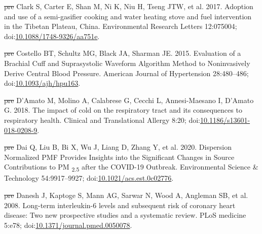 \documentclass[
  letterpaper,
  DIV=11,
  numbers=noendperiod]{scrartcl}
\newlength{\cslhangindent}
\newenvironment{CSLReferences}[2] %
 {\begin{list}{}{%
  \setlength{\itemindent}{0pt} %
  \setlength{\leftmargin}{0pt} %
  \setlength{\parsep}{0pt} %
  \ifodd #1
   \setlength{\leftmargin}{\cslhangindent} %
   \setlength{\itemindent}{-1\cslhangindent} %
  \fi
  \setlength{\itemsep}{#2\baselineskip}}} %
 {\end{list}} %
\providecommand{\DIFdel}[1]{{\protect\color{red}\sout{#1}}}                      %
\providecommand{\DIFaddbegin}{} %
\providecommand{\DIFaddend}{} %
\providecommand{\DIFdelbegin}{} %
\providecommand{\DIFdelend}{} %
\newcommand{\DIFscaledelfig}{0.5}
\newlength{\DIFdelgraphicswidth} %
\newlength{\DIFdelgraphicsheight} %
\newcommand{\DIFaddincludegraphics}[2][]{{\color{blue}\fbox{\DIFOincludegraphics[#1]{#2}}}} %
\newcommand{\DIFdelincludegraphics}[2][]{%
\sbox{\DIFdelgraphicsbox}{\DIFOincludegraphics[#1]{#2}}%
\settoboxwidth{\DIFdelgraphicswidth}{\DIFdelgraphicsbox} %
\settoboxtotalheight{\DIFdelgraphicsheight}{\DIFdelgraphicsbox} %
\scalebox{\DIFscaledelfig}{%
\parbox[b]{\DIFdelgraphicswidth}{\usebox{\DIFdelgraphicsbox}\\[-\baselineskip] \rule{\DIFdelgraphicswidth}{0em}}\llap{\resizebox{\DIFdelgraphicswidth}{\DIFdelgraphicsheight}{%
\setlength{\unitlength}{\DIFdelgraphicswidth}%
\begin{picture}(1,1)%
\thicklines\linethickness{2pt} %
{\color[rgb]{1,0,0}\put(0,0){\framebox(1,1){}}}%
{\color[rgb]{1,0,0}\put(0,0){\line( 1,1){1}}}%
{\color[rgb]{1,0,0}\put(0,1){\line(1,-1){1}}}%
\end{picture}%
}\hspace*{3pt}}} %
} %
\DeclareRobustCommand{\DIFaddbegin}{\DIFOaddbegin \let\includegraphics\DIFaddincludegraphics} %
\DeclareRobustCommand{\DIFaddend}{\DIFOaddend \let\includegraphics\DIFOincludegraphics} %
\DeclareRobustCommand{\DIFdelbegin}{\DIFOdelbegin \let\includegraphics\DIFdelincludegraphics} %
\DeclareRobustCommand{\DIFdelend}{\DIFOaddend \let\includegraphics\DIFOincludegraphics} %
\begin{document}
\begin{CSLReferences}{1}{1}
\DIFdelbegin %
\DIFdel{pre}%
\DIFdelend \DIFaddbegin {}
\DIFaddend Clark S, Carter E, Shan M, Ni K, Niu H, Tseng JTW, et al. 2017. Adoption
and use of a semi-gasifier cooking and water heating stove and fuel
intervention in the {Tibetan Plateau}, {China}. Environmental Research
Letters 12:075004;
doi:\href{https://doi.org/10.1088/1748-9326/aa751e}{10.1088/1748-9326/aa751e}.

\DIFdelbegin %
\DIFdel{pre}%
\DIFdelend \DIFaddbegin {}
\DIFaddend Costello BT, Schultz MG, Black JA, Sharman JE. 2015. Evaluation of a
{Brachial Cuff} and {Suprasystolic Waveform Algorithm Method} to
{Noninvasively Derive Central Blood Pressure}. American Journal of
Hypertension 28:480--486;
doi:\href{https://doi.org/10.1093/ajh/hpu163}{10.1093/ajh/hpu163}.

\DIFdelbegin %
\DIFdel{pre}%
\DIFdelend \DIFaddbegin {}
\DIFaddend D'Amato M, Molino A, Calabrese G, Cecchi L, Annesi-Maesano I, D'Amato G.
2018. The impact of cold on the respiratory tract and its consequences
to respiratory health. Clinical and Translational Allergy 8:20;
doi:\href{https://doi.org/10.1186/s13601-018-0208-9}{10.1186/s13601-018-0208-9}.

\DIFdelbegin %
\DIFdel{pre}%
\DIFdelend \DIFaddbegin {}
\DIFaddend Dai Q, Liu B, Bi X, Wu J, Liang D, Zhang Y, et al. 2020. Dispersion
{Normalized PMF Provides Insights} into the {Significant Changes} in
{Source Contributions} to {PM} {\textsubscript{2.5}} after the {COVID-19
Outbreak}. Environmental Science \& Technology 54:9917--9927;
doi:\href{https://doi.org/10.1021/acs.est.0c02776}{10.1021/acs.est.0c02776}.

\DIFdelbegin %
\DIFdel{pre}%
\DIFdelend \DIFaddbegin {}
\DIFaddend Danesh J, Kaptoge S, Mann AG, Sarwar N, Wood A, Angleman SB, et al.
2008. Long-term interleukin-6 levels and subsequent risk of coronary
heart disease: Two new prospective studies and a systematic review. PLoS
medicine 5:e78;
doi:\href{https://doi.org/10.1371/journal.pmed.0050078}{10.1371/journal.pmed.0050078}.


\end{CSLReferences}
\end{document}
